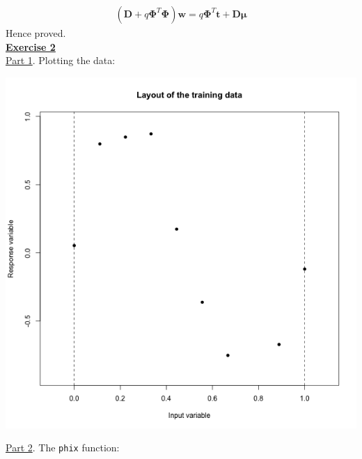 \documentclass[a4paper, 11pt]{article}\usepackage[]{graphicx}\usepackage[]{color}
\begin{document}
\begin{eqnarray}
\left( \mathbf{D} + q \mathbf{\Phi}^T \mathbf{\Phi} \right) \mathbf{w} = q\mathbf{\Phi}^T \mathbf{t} + \mathbf{D\mu} \nonumber
\end{eqnarray}
Hence proved.\\
\newpage
\textbf{\underline{Exercise 2}}\\
\newline \underline{Part 1}. Plotting the data:\\
\begin{center}
\includegraphics[scale=0.6]{ps2_plot1.png}
\end{center}
\underline{Part 2}. The \texttt{phix} function:
\end{document}
